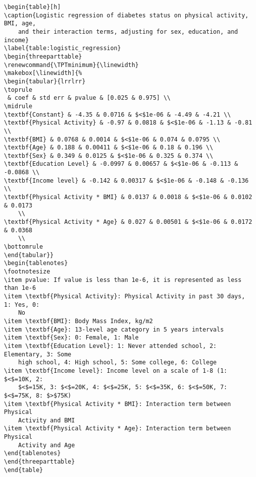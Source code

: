 \documentclass[11pt]{article}
\begin{document}
\begin{Verbatim}[tabsize=4]
\begin{table}[h]
\caption{Logistic regression of diabetes status on physical activity, BMI, age,
	and their interaction terms, adjusting for sex, education, and income}
\label{table:logistic_regression}
\begin{threeparttable}
\renewcommand{\TPTminimum}{\linewidth}
\makebox[\linewidth]{%
\begin{tabular}{lrrlrr}
\toprule
 & coef & std err & pvalue & [0.025 & 0.975] \\
\midrule
\textbf{Constant} & -4.35 & 0.0716 & $<$1e-06 & -4.49 & -4.21 \\
\textbf{Physical Activity} & -0.97 & 0.0818 & $<$1e-06 & -1.13 & -0.81 \\
\textbf{BMI} & 0.0768 & 0.0014 & $<$1e-06 & 0.074 & 0.0795 \\
\textbf{Age} & 0.188 & 0.00411 & $<$1e-06 & 0.18 & 0.196 \\
\textbf{Sex} & 0.349 & 0.0125 & $<$1e-06 & 0.325 & 0.374 \\
\textbf{Education Level} & -0.0997 & 0.00657 & $<$1e-06 & -0.113 & -0.0868 \\
\textbf{Income level} & -0.142 & 0.00317 & $<$1e-06 & -0.148 & -0.136 \\
\textbf{Physical Activity * BMI} & 0.0137 & 0.0018 & $<$1e-06 & 0.0102 & 0.0173
	\\
\textbf{Physical Activity * Age} & 0.027 & 0.00501 & $<$1e-06 & 0.0172 & 0.0368
	\\
\bottomrule
\end{tabular}}
\begin{tablenotes}
\footnotesize
\item pvalue: If value is less than 1e-6, it is represented as less than 1e-6
\item \textbf{Physical Activity}: Physical Activity in past 30 days, 1: Yes, 0:
	No
\item \textbf{BMI}: Body Mass Index, kg/m2
\item \textbf{Age}: 13-level age category in 5 years intervals
\item \textbf{Sex}: 0: Female, 1: Male
\item \textbf{Education Level}: 1: Never attended school, 2: Elementary, 3: Some
	high school, 4: High school, 5: Some college, 6: College
\item \textbf{Income level}: Income level on a scale of 1-8 (1: $<$=10K, 2:
	$<$=15K, 3: $<$=20K, 4: $<$=25K, 5: $<$=35K, 6: $<$=50K, 7: $<$=75K, 8: $>$75K)
\item \textbf{Physical Activity * BMI}: Interaction term between Physical
	Activity and BMI
\item \textbf{Physical Activity * Age}: Interaction term between Physical
	Activity and Age
\end{tablenotes}
\end{threeparttable}
\end{table}

\end{Verbatim}




\end{document}
